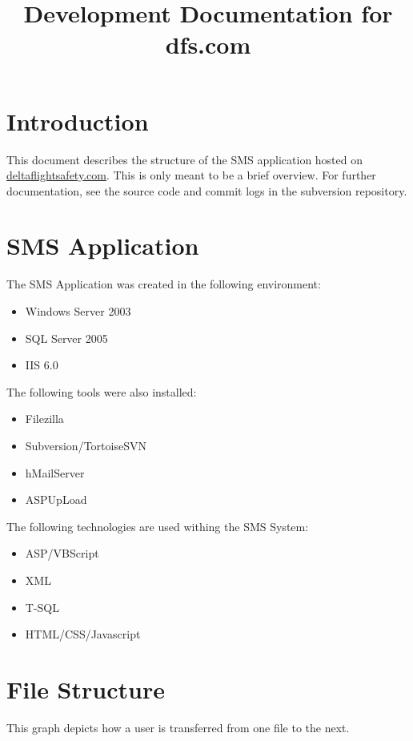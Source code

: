 \documentclass[letterpaper]{article}
\title{Development Documentation for dfs.com}
\author{}
\begin{document}
\maketitle
\tableofcontents
\clearpage

\section{Introduction}

This document describes the structure of the SMS application hosted on
\url{deltaflightsafety.com}. This is only meant to be a brief overview. For
further documentation, see the source code and commit logs in the subversion
repository.

\section{SMS Application}

The SMS Application was created in the following environment:
\begin{itemize}
    \item Windows Server 2003
    \item SQL Server 2005
    \item IIS 6.0
\end{itemize}

The following tools were also installed:
\begin{itemize}
    \item Filezilla
    \item Subversion/TortoiseSVN
    \item hMailServer
    \item ASPUpLoad
\end{itemize}

The following technologies are used withing the SMS System:
\begin{itemize}
    \item ASP/VBScript
    \item XML
    \item T-SQL
    \item HTML/CSS/Javascript
\end{itemize}

\section{File Structure}

This graph depicts how a user is transferred from one file to the next.
\end{document}
